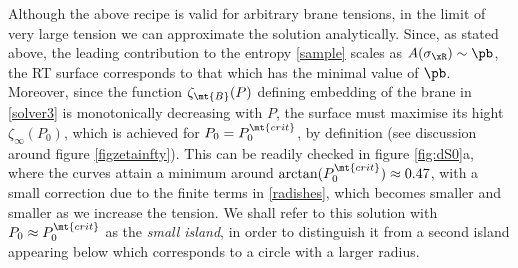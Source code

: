 Although the above recipe is valid for arbitrary brane tensions, in the limit of very large tension we can approximate the solution analytically. Since, as stated above, the leading contribution to the entropy \eqref{sample} scales as $A(\sigma_\xR)\sim \pb$, the RT surface corresponds to that which has the minimal value of $\pb$. Moreover, since the function $\zeta_{\mt{B}}(P)$ defining embedding of the brane in \eqref{solver3} is monotonically decreasing with $P$, the surface must maximise its hight $\zeta_\infty(P_0)$, which is achieved for $P_0=P_0^{\mt{crit}}$, by definition (see discussion around figure \ref{figzetainfty}). This can be readily checked in figure \ref{fig:dS0}a, where the curves attain a minimum around $\mbox{arctan}(P_0^{\mt{crit}})\approx 0.47$, with a small correction due to the finite terms in \eqref{radishes}, which becomes smaller and smaller as we increase the tension. We shall refer to this solution with $P_0\approx P_0^{\mt{crit}}$ as the \textit{small island}, in order to distinguish it from a second island appearing below which corresponds to a circle with a larger radius.  





